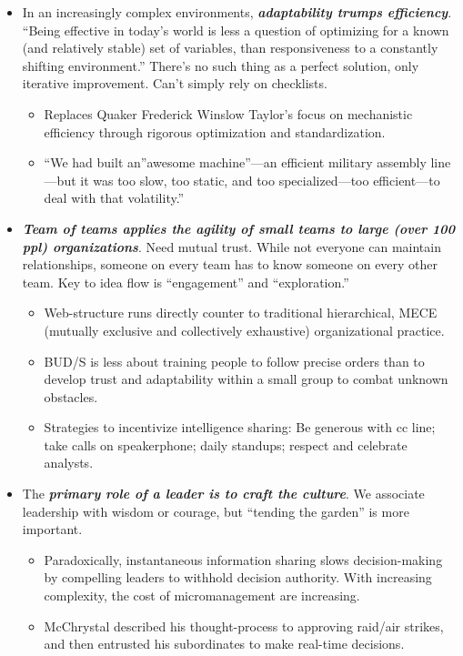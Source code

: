 \documentclass[
]{article}
\begin{document}
\begin{itemize}
\item
  In an increasingly complex environments, \textbf{\emph{adaptability
  trumps efficiency}}. ``Being effective in today's world is less a
  question of optimizing for a known (and relatively stable) set of
  variables, than responsiveness to a constantly shifting environment.''
  There's no such thing as a perfect solution, only iterative
  improvement. Can't simply rely on checklists.

  \begin{itemize}
  \item
    Replaces Quaker Frederick Winslow Taylor's focus on mechanistic
    efficiency through rigorous optimization and standardization.
  \item
    ``We had built an''awesome machine''---an efficient military
    assembly line---but it was too slow, too static, and too
    specialized---too efficient---to deal with that volatility.''
  \end{itemize}
\item
  \textbf{\emph{Team of teams applies the agility of small teams to
  large (over 100 ppl) organizations}}. Need mutual trust. While not
  everyone can maintain relationships, someone on every team has to know
  someone on every other team. Key to idea flow is ``engagement'' and
  ``exploration.''

  \begin{itemize}
  \item
    Web-structure runs directly counter to traditional hierarchical,
    MECE (mutually exclusive and collectively exhaustive) organizational
    practice.
  \item
    BUD/S is less about training people to follow precise orders than to
    develop trust and adaptability within a small group to combat
    unknown obstacles.
  \item
    Strategies to incentivize intelligence sharing: Be generous with cc
    line; take calls on speakerphone; daily standups; respect and
    celebrate analysts.
  \end{itemize}
\item
  The \textbf{\emph{primary role of a leader is to craft the culture}}.
  We associate leadership with wisdom or courage, but ``tending the
  garden'' is more important.

  \begin{itemize}
  \item
    Paradoxically, instantaneous information sharing slows
    decision-making by compelling leaders to withhold decision
    authority. With increasing complexity, the cost of micromanagement
    are increasing.
  \item
    McChrystal described his thought-process to approving raid/air
    strikes, and then entrusted his subordinates to make real-time
    decisions.
  \end{itemize}
\end{itemize}
\end{document}
